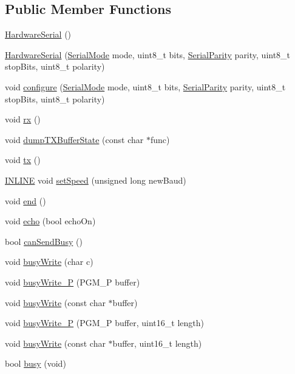 \subsection*{Public Member Functions}
\begin{DoxyCompactItemize}
\item 
\hyperlink{classflame_1_1_hardware_serial_a5b1458a430238e6c27c799069cd0de36}{Hardware\-Serial} ()
\item 
\hyperlink{classflame_1_1_hardware_serial_a4daa0cb5bb4be6d9836a87411d01139e}{Hardware\-Serial} (\hyperlink{namespaceflame_a9cbc9720f0e2f002f6f8fdf746fad4db}{Serial\-Mode} mode, uint8\-\_\-t bits, \hyperlink{namespaceflame_a6613d9a37cacb0a55b287dcf2f60f5db}{Serial\-Parity} parity, uint8\-\_\-t stop\-Bits, uint8\-\_\-t polarity)
\item 
void \hyperlink{classflame_1_1_hardware_serial_aeff320dad035e17a806233bcd2a44c34}{configure} (\hyperlink{namespaceflame_a9cbc9720f0e2f002f6f8fdf746fad4db}{Serial\-Mode} mode, uint8\-\_\-t bits, \hyperlink{namespaceflame_a6613d9a37cacb0a55b287dcf2f60f5db}{Serial\-Parity} parity, uint8\-\_\-t stop\-Bits, uint8\-\_\-t polarity)
\item 
void \hyperlink{classflame_1_1_hardware_serial_ab56390f7a1c6de2db5cc81570fc1b334}{rx} ()
\item 
void \hyperlink{classflame_1_1_hardware_serial_a0fdf2aaad78c997238b73243578be4f0}{dump\-T\-X\-Buffer\-State} (const char $\ast$func)
\item 
void \hyperlink{classflame_1_1_hardware_serial_a84c0ecca0cba82af78444612fe3d67b8}{tx} ()
\item 
\hyperlink{io_8h_a2eb6f9e0395b47b8d5e3eeae4fe0c116}{I\-N\-L\-I\-N\-E} void \hyperlink{classflame_1_1_hardware_serial_a39f9df6aa5235c515a7d1a6d27292846}{set\-Speed} (unsigned long new\-Baud)
\item 
void \hyperlink{classflame_1_1_hardware_serial_a82717797b31505d8ce92de7a554afade}{end} ()
\item 
void \hyperlink{classflame_1_1_hardware_serial_a62286cc6c5686cf9c8a7823f9386a949}{echo} (bool echo\-On)
\item 
bool \hyperlink{classflame_1_1_hardware_serial_a2aac6f2b081b2449a666bd73ac470b26}{can\-Send\-Busy} ()
\item 
void \hyperlink{classflame_1_1_hardware_serial_aba8e852537e4b17ed01c120e5b6655d3}{busy\-Write} (char c)
\item 
void \hyperlink{classflame_1_1_hardware_serial_a9facf2f539793a554ff3ad33085efac9}{busy\-Write\-\_\-\-P} (P\-G\-M\-\_\-\-P buffer)
\item 
void \hyperlink{classflame_1_1_hardware_serial_ad61b8dc18e76aaa506c5b712a5df805c}{busy\-Write} (const char $\ast$buffer)
\item 
void \hyperlink{classflame_1_1_hardware_serial_aeea82edb6cb58c605ba467734eaeacc7}{busy\-Write\-\_\-\-P} (P\-G\-M\-\_\-\-P buffer, uint16\-\_\-t length)
\item 
void \hyperlink{classflame_1_1_hardware_serial_a05dc22e70d05f0148ae86e831707aa28}{busy\-Write} (const char $\ast$buffer, uint16\-\_\-t length)
\item 
bool \hyperlink{classflame_1_1_hardware_serial_a10df6bb4b515a04b4e738238058ccd29}{busy} (void)
\end{DoxyCompactItemize}
